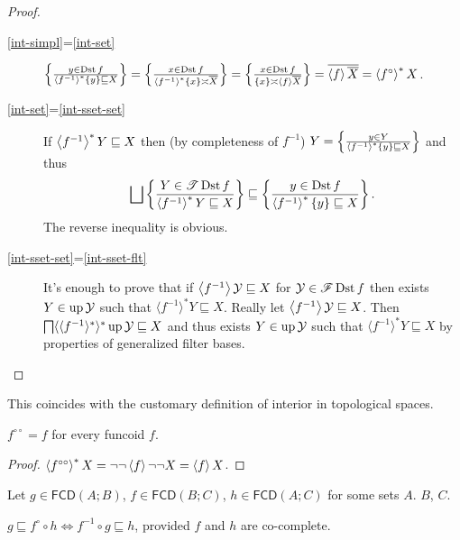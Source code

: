 \begin{proof}
  ~
  \begin{description}
    \item[\ref{int-simpl}=\ref{int-set}] $\left\{ \frac{ y \in \operatorname{Dst} f }{
    \left\langle f^{- 1}\right\rangle ^{\ast} \{ y \} \sqsubseteq X }\right\} = \left\{ \frac{ x \in
    \operatorname{Dst} f }{ \left\langle f^{- 1}\right\rangle ^{\ast} \{
    x \} \asymp \overline{X} }\right\} = \left\{ \frac{ x \in \operatorname{Dst} f
    }{ \{ x \} \asymp \left\langle f\right\rangle
    \overline{X} }\right\} = \overline{\left\langle f\right\rangle \overline{X}} =
    \left\langle f^{\circ}\right\rangle ^{\ast} X$.
    
    \item[\ref{int-set}=\ref{int-sset-set}] If $\left\langle f^{- 1}\right\rangle ^{\ast} Y \sqsubseteq X$ then (by
    completeness of $f^{- 1}$) $Y = \left\{ \frac{ y \in Y }{
    \left\langle f^{- 1}\right\rangle ^{\ast} \{ y \} \sqsubseteq X }\right\}$ and thus
    \[ \bigsqcup \setcond{ Y \in \mathscr{T} \Dst f }
       { \rsupfun{f^{- 1}} Y \sqsubseteq X }
       \sqsubseteq \setcond{ y \in \Dst f }{
       \rsupfun{f^{- 1}} \{ y \} \sqsubseteq X } . \]
    The reverse inequality is obvious.
    
    \item[\ref{int-sset-set}=\ref{int-sset-flt}] It's enough to prove that if $\left\langle f^{- 1}\right\rangle
    \mathcal{Y} \sqsubseteq X$ for $\mathcal{Y} \in \mathscr{F} \operatorname{Dst} f$
    then exists $Y \in \operatorname{up} \mathcal{Y}$ such that $\langle f^{- 1}
    \rangle^{\ast} Y \sqsubseteq X$. Really let $\left\langle f^{- 1}\right\rangle
    \mathcal{Y} \sqsubseteq X$. Then $\bigsqcap \langle \langle f^{- 1}
    \rangle^{\ast} \rangle^{\ast} \operatorname{up} \mathcal{Y} \sqsubseteq X$ and
    thus exists $Y \in \operatorname{up} \mathcal{Y}$ such that $\langle f^{- 1}
    \rangle^{\ast} Y \sqsubseteq X$ by properties of generalized filter bases.
  \end{description}
\end{proof}

This coincides with the customary definition of interior in topological
spaces.

\begin{prop}
  $f^{\circ \circ} = f$ for every funcoid $f$.
\end{prop}

\begin{proof}
  $\left\langle f^{\circ\circ}\right\rangle ^{\ast} X = \neg \neg \left\langle f\right\rangle
  \neg \neg X = \left\langle f\right\rangle X$.
\end{proof}

\begin{prop}\label{get-rid-interior}
  Let $g \in \mathsf{FCD} (A ; B)$, $f \in \mathsf{FCD} (B ;
  C)$, $h \in \mathsf{FCD} (A ; C)$ for some sets $A$. $B$, $C$.
  
  $g \sqsubseteq f^{\circ} \circ h \Leftrightarrow f^{- 1} \circ g \sqsubseteq
  h$, provided $f$ and $h$ are co-complete.
\end{prop}

